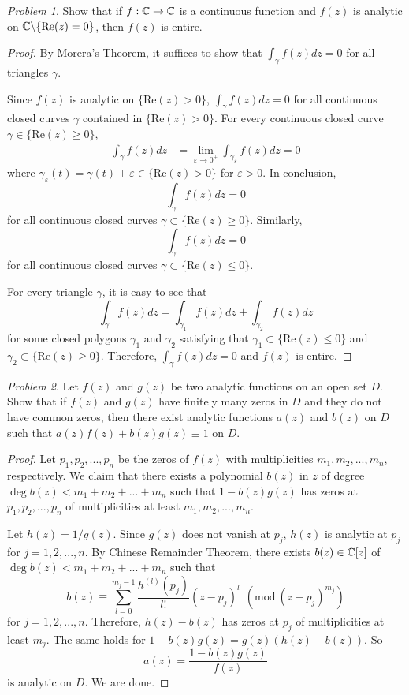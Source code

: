 \documentclass[11pt]{amsart}
\theoremstyle{remark}
\newtheorem{prob}{Problem}[section]
\theoremstyle{definition}
\numberwithin{equation}{section}
\begin{document}
\begin{prob}
    Show that if $f: {\mathbb C}\to {\mathbb C}$ is a continuous function and $f(z)$ is analytic
    on ${\mathbb C}\backslash \{\text{Re}(z) = 0\}$, then $f(z)$ is entire.
\end{prob}

\begin{proof}
    By Morera's Theorem, it suffices to show that $\int_{\gamma} f(z) dz = 0$ for all triangles $\gamma$.

    Since $f(z)$ is analytic on $\{\text{Re}(z) > 0\}$, $\int_{\gamma} f(z) dz = 0$
    for all continuous closed curves $\gamma$ contained in $\{\text{Re}(z) > 0\}$. For every continuous closed curve $\gamma\in \{\text{Re}(z) \ge 0\}$,
    \[
        \begin{aligned}
            \int_{\gamma} f(z) dz & = \lim_{\varepsilon\to 0^+} \int_{\gamma_{\varepsilon}} f(z) dz = 0
        \end{aligned}
    \]
    where $\gamma_{\varepsilon}(t) = \gamma(t) + \varepsilon\in \{\text{Re}(z) > 0\}$ for $\varepsilon > 0$. In conclusion,
    \[
        \int_{\gamma} f(z)dz = 0
    \]
    for all continuous closed curves $\gamma\subset \{\text{Re}(z) \ge 0\}$. Similarly,
    \[
        \int_{\gamma} f(z)dz = 0
    \]
    for all continuous closed curves $\gamma\subset \{\text{Re}(z) \le 0\}$.

    For every triangle $\gamma$, it is easy to see that
    \[
        \int_{\gamma} f(z) dz = \int_{\gamma_1} f(z) dz + \int_{\gamma_2} f(z) dz
    \]
    for some closed polygons $\gamma_1$ and $\gamma_2$ satisfying that
    $\gamma_1\subset \{\text{Re}(z) \le 0\}$ and $\gamma_2\subset \{\text{Re}(z) \ge 0\}$. Therefore, $\int_{\gamma} f(z)dz = 0$ and $f(z)$ is entire.
\end{proof}

\begin{prob}
    Let $f(z)$ and $g(z)$ be two analytic functions on an open set $D$. Show that if $f(z)$ and $g(z)$ have finitely many zeros in $D$ and they do not have common zeros, then there exist analytic functions $a(z)$ and $b(z)$ on $D$ such that $a(z) f(z) + b(z) g(z) \equiv 1$ on $D$.
\end{prob}

\begin{proof}
    Let $p_1,p_2,...,p_n$ be the zeros of $f(z)$ with multiplicities $m_1,m_2,...,m_n$, respectively. We claim that there exists a polynomial $b(z)$ in $z$ of degree $\deg b(z) < m_1 + m_2 + ... + m_n$ such that $1-b(z)g(z)$ has zeros at $p_1,p_2,...,p_n$ of multiplicities at least $m_1,m_2,...,m_n$.

    Let $h(z) = 1/g(z)$. Since $g(z)$ does not vanish at $p_j$,
    $h(z)$ is analytic at $p_j$ for $j=1,2,...,n$. By Chinese Remainder Theorem,
    there exists $b(z)\in {\mathbb C}[z]$ of $\deg b(z) < m_1 + m_2 + ... + m_n$ such that
    \[
        b(z) \equiv \sum_{l=0}^{m_j-1} \frac{h^{(l)}(p_j)}{l!} (z-p_j)^l
        \ \ (\text{mod}\ (z-p_j)^{m_j})
    \]
    for $j=1,2,...,n$. Therefore, $h(z) - b(z)$ has zeros at $p_j$ of multiplicities at least $m_j$. The same holds for
    $1 - b(z)g(z) = g(z)(h(z) - b(z))$. So
    \[
        a(z) = \frac{1-b(z)g(z)}{f(z)}
    \]
    is analytic on $D$. We are done.
\end{proof}
\end{document}
